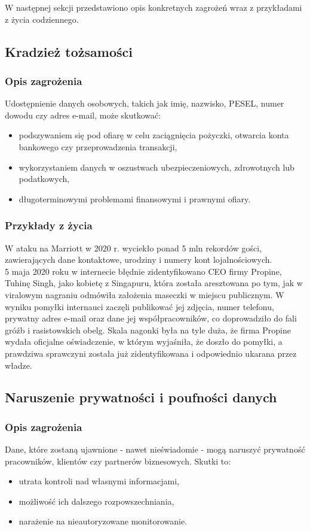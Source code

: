 W następnej sekcji przedstawiono opis konkretnych zagrożeń wraz z przykładami z życia codziennego. \cite{zagrozeniaFirmy, zagrozeniaLudzie}

\subsection{Kradzież tożsamości}
\subsubsection{Opis zagrożenia}
Udostępnienie danych osobowych, takich jak imię, nazwisko, PESEL, numer dowodu czy adres e-mail, może skutkować:
\begin{itemize}
\item podszywaniem się pod ofiarę w celu zaciągnięcia pożyczki, otwarcia konta bankowego czy przeprowadzenia transakcji,
\item wykorzystaniem danych w oszustwach ubezpieczeniowych, zdrowotnych lub podatkowych,
\item długoterminowymi problemami finansowymi i prawnymi ofiary.
\end{itemize}
\subsubsection{Przykłady z życia}
W ataku na Marriott w 2020 r. wyciekło ponad 5 mln rekordów gości, zawierających dane kontaktowe, urodziny i numery kont lojalnościowych.\\

5 maja 2020 roku w internecie błędnie zidentyfikowano CEO firmy Propine, Tuhinę Singh, jako kobietę z Singapuru, która została aresztowana po tym, jak w viralowym nagraniu odmówiła założenia maseczki w miejscu publicznym.
W wyniku pomyłki internauci zaczęli publikować jej zdjęcia, numer telefonu, prywatny adres e-mail oraz dane jej współpracowników, co doprowadziło do fali gróźb i rasistowskich obelg.
Skala nagonki była na tyle duża, że firma Propine wydała oficjalne oświadczenie, w którym wyjaśniła, że doszło do pomyłki, a prawdziwa sprawczyni została już zidentyfikowana i odpowiednio ukarana przez władze.

\subsection{Naruszenie prywatności i poufności danych}
\subsubsection{Opis zagrożenia}
Dane, które zostaną ujawnione - nawet nieświadomie - mogą naruszyć prywatność pracowników, klientów czy partnerów biznesowych. Skutki to:
\begin{itemize}
\item utrata kontroli nad własnymi informacjami,
\item możliwość ich dalszego rozpowszechniania,
\item narażenie na nieautoryzowane monitorowanie.
\end{itemize}
